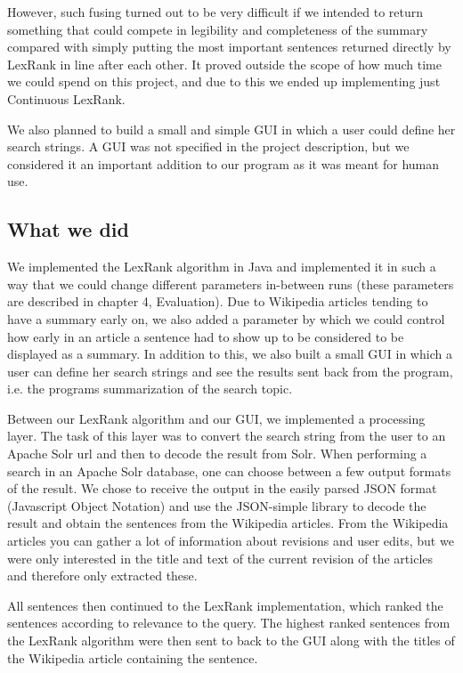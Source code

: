 \documentclass[10pt, a4paper]{article}
\begin{document}
However, such fusing turned out to be very difficult if we intended to return something that could compete in legibility and completeness of the summary compared with simply putting the most important sentences returned directly by LexRank in line after each other. It proved outside the scope of how much time we could spend on this project, and due to this we ended up implementing just Continuous LexRank.

We also planned to build a small and simple GUI in which a user could define her search strings. A GUI was not specified in the project description, but we considered it an important addition to our program as it was meant for human use.

\subsection{What we did}


We implemented the LexRank algorithm in Java and implemented it in such a way that we could change different parameters in-between runs (these parameters are described in chapter 4, Evaluation). Due to Wikipedia articles tending to have a summary early on, we also added a parameter by which we could control how early in an article a sentence had to show up to be considered to be displayed as a summary. In addition to this, we also built a small GUI in which a user can define her search strings and see the results sent back from the program, i.e. the programs summarization of the search topic. 

Between our LexRank algorithm and our GUI, we implemented a processing layer. The task of this layer was to convert the search string from the user to an Apache Solr url and then to decode the result from Solr. When performing a search in an Apache Solr database, one can choose between a few output formats of the result. We chose to receive the output in the easily parsed JSON format (Javascript Object Notation) and use the JSON-simple library to decode the result and obtain the sentences from the Wikipedia articles. From the Wikipedia articles you can gather a lot of information about revisions and user edits, but we were only interested in the title and text of the current revision of the articles and therefore only extracted these. 

All sentences then continued to the LexRank implementation, which ranked the sentences according to relevance to the query. The highest ranked sentences from the LexRank algorithm were then sent to back to the GUI along with the titles of the Wikipedia article containing the sentence. 
\end{document}
